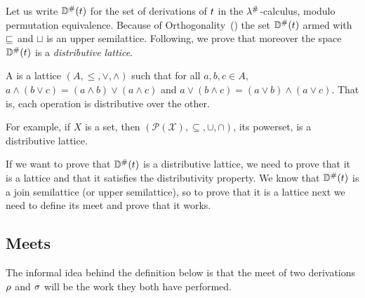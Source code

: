 \bigskip

Let us write $\mathbb{D}^{\mathtt{\#}}(t)$ for the set of derivations of
$t$ in the $\lambda^{\mathtt{\#}}$-calculus,
modulo permutation equivalence.
Because of Orthogonality~()
the set $\mathbb{D}^{\mathtt{\#}}(t)$ armed with $\sqsubseteq$ and $\sqcup$ is an upper semilattice.
Following, we prove that moreover the space $\mathbb{D}^{\mathtt{\#}}(t)$
is a {\em distributive lattice}.

\begin{definition}
A  is a lattice $(A, \leq, \vee, \wedge)$
such that for all $a,b,c \in A$,
$a \wedge (b \vee c) = (a \wedge b) \vee (a \wedge c)$ and
$a \vee (b \wedge c) = (a \vee b) \wedge (a \vee c)$.
That is, each operation is distributive over the other.
\end{definition}

\begin{example}
For example, if $X$ is a set, then $(\mathcal{P}(\mathcal{X}), \subseteq, \cup, \cap)$,
its powerset,
is a distributive lattice.
\end{example}

If we want to prove that $\mathbb{D}^{\mathtt{\#}}(t)$ is a distributive lattice,
we need to prove that it is a lattice and that it satisfies the distributivity property.
We know that $\mathbb{D}^{\mathtt{\#}}(t)$ is a join semilattice (or upper semilattice), so
to prove that it is a lattice next we need to define its meet and prove that it works.

\subsection*{Meets}

The informal idea behind the definition below
is that the meet of two derivations $\rho$ and $\sigma$
will be the work they both have performed.

